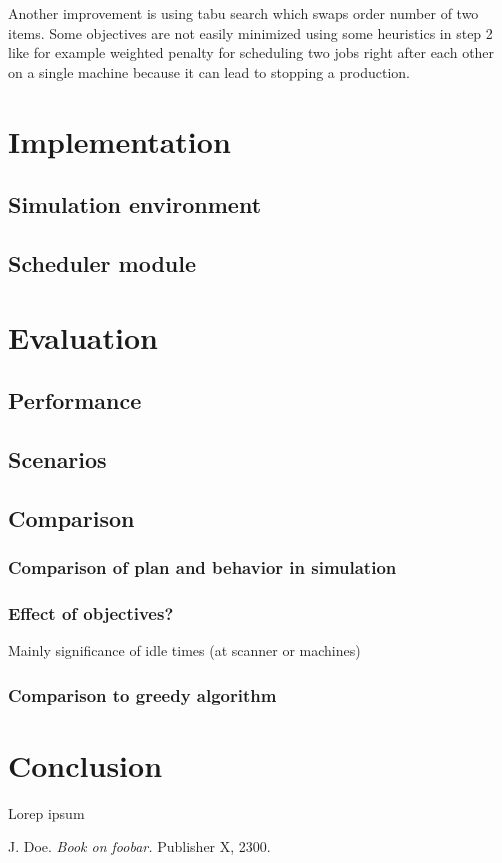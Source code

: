 \documentclass{ctuthesis}
\begin{document}
Another improvement is using tabu search which swaps order number of two items. Some objectives are not easily minimized using some heuristics in step 2 like for example weighted penalty for scheduling two jobs right after each other on a single machine because it can lead to stopping a production. 

\chapter{Implementation}
\section{Simulation environment}
\section{Scheduler module}
\chapter{Evaluation}
\section{Performance}
\section{Scenarios}
\section{Comparison}
\subsection{Comparison of plan and behavior in simulation}
\subsection{Effect of objectives?}
Mainly significance of idle times (at scanner or machines)
\subsection{Comparison to greedy algorithm}
\chapter{Conclusion}

Lorep ipsum \cite{doe}

\begin{thebibliography}{1}

 J. Doe. \emph{Book on foobar.} Publisher X,
 2300.

\end{thebibliography}
\end{document}

